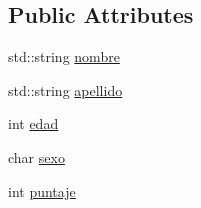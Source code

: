 \subsection*{Public Attributes}
\begin{DoxyCompactItemize}
\item 
std\+::string \hyperlink{class_paciente_aa038dc802c746b2ceb990400aca1bf92}{nombre}
\item 
std\+::string \hyperlink{class_paciente_adaa241cbab07b786730e27b82e303616}{apellido}
\item 
int \hyperlink{class_paciente_a5a873f7b3df047548f58ec7a9d4ca29c}{edad}
\item 
char \hyperlink{class_paciente_aaf0b95139b3d6bf6f475b52050b8613c}{sexo}
\item 
int \hyperlink{class_paciente_a42560c348305a28a57a59294294f59f8}{puntaje}
\end{DoxyCompactItemize}


